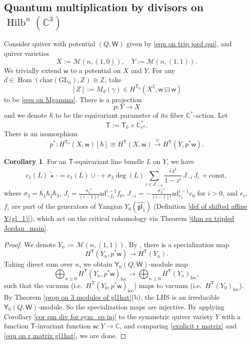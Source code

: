 \documentclass[10pt]{amsart}
\theoremstyle{definition}
\newtheorem{Corollary}[Theorem]{Corollary}
\numberwithin{equation}{section}
\newcommand{\C}{\mathbb{C}}
\newcommand{\bC}{\mathbb{C}}
\newcommand{\cM}{\mathcal{M}}
\newcommand{\loc}{\mathrm{loc}}
\newcommand{\sT}{\mathsf{T}}
\newcommand{\sW}{\mathsf{W}}
\newcommand{\sw}{\mathsf{w}}
\newcommand{\Hilb}{\operatorname{Hilb}}
\newcommand{\Hom}{\operatorname{Hom}}
\begin{document}
\subsection{Quantum multiplication by divisors on $\Hilb^n(\C^3)$}\label{sect on qm by div on hilb}

Consider quiver with potential $(Q,\sW)$ given by \eqref{equ on trip jord qui}, and quiver varieties 
$$X:=\cM(n,(1,0)), \quad Y:=\cM(n,(1,1)).  $$
We trivially extend $\sw$ to a potential on $X$ and $Y$. 
For any $d\in \Hom(\mathrm{char}(\mathrm{GL}_n),\mathbb{Z})\cong \mathbb{Z}$, take 
$$[Z]:=M_{d}(\gamma)\in H^{\sT_0}(X^2,\sw\boxminus \sw) $$
to be \eqref{equ on Mgamma}.
There is a projection 
$$p\colon Y\to X$$ and we denote $\hbar$ to be the equivariant parameter of its fiber $\C^*$-action. 
Let $$\sT:=\sT_0\times \C^*_{e^\hbar}.$$
There is an isomorphism 
$$p^*\colon H^{\sT_0}(X,\sw)[\hbar]\cong H^{\sT}(X,\sw) \stackrel{\cong}{\to} H^{\sT}(Y,p^*\sw). $$

\begin{Corollary}\label{cor on qm of sym of hilb}
For an $\sT$-equivariant line bundle $L$ on $Y$, we have 
$$c_1(L)\, \widetilde{\star}\, \cdot =c_1(L)\cup \cdot+\sigma_3\deg(L)\sum_{i\in \mathbb{Z}_{>0}}\frac{iz^i}{1-z^i}\,J_{-i}\, J_{i} \,+\mathrm{const}, $$
where $\sigma_3=\hbar_1\hbar_2\hbar_3$, $J_i=\frac{\sigma_3^{-i}}{(i-1)!} \text{ad}^{i-1} _{-f_1} f_0$, $J_{-i}=-\frac{\sigma_3^{-i}}{(i-1)!} \text{ad}^{i-1} _{e_1} e_0$ for $i>0$,
and $e_i$, $f_i$ are part of the generators of Yangian $Y_{0}(\widehat{\mathfrak{gl}_1})$ (Definition \ref{def of shifted affine Y(gl_1)}), which act on the critical cohomology via Theorem \ref{thm ex tripled Jordan_main}. 
\end{Corollary}
\begin{proof}
We denote $Y_n:=\cM(n,(1,1))$. By \cite[Ex.~7.19]{COZZ}, there is a specialization map 
$$H^{\sT}(Y_n,p^*\sw)\to H^{\sT}(Y_n). $$
Taking direct sum over $n$, we obtain $\mathsf Y_{0}(Q,\sW)$-module map 
$$\bigoplus_{n\geqslant 0} H^{\sT}(Y_n,p^*\sw)_{\loc}\to \bigoplus_{n\geqslant 0}  H^{\sT}(Y_n)_{\loc}, $$
such that the vacuum (i.e.~$H^{\sT}(Y_0,p^*\sw)_{\loc}$) maps to vacuum (i.e.~$H^{\sT}(Y_0)_{\loc}$).
By Theorem \ref{prop on 3 modules of gl1hat}\.(b), the LHS is an irreducible $\mathsf Y_{0}(Q,\sW)$-module. 
So the specialization maps are injective.
By applying Corollary \ref{cor qm div for sym_sp inj} to the symmetric quiver variety $Y$ with a function $\sT$-invariant function $\sw\colon Y\to \bC$, and comparing \eqref{explicit r matrix} and \eqref{equ on r matrix gl1hat}, we are done.
\end{proof}
\end{document}
